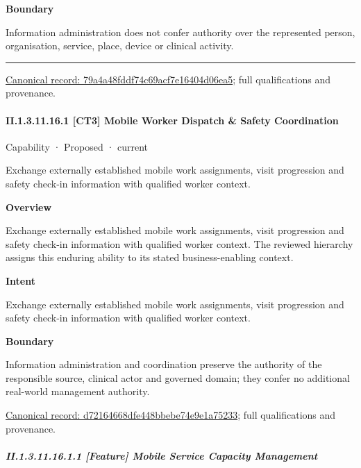 \textbf{Boundary}



Information administration does not confer authority over the represented person, organisation, service, place, device or clinical activity.



\medskip\hrule\medskip

{\footnotesize \href{../../../../continuum/strategy/capability/79a4a48fddf74c69acf7e16404d06ea5.md}{Canonical record: 79a4a48fddf74c69acf7e16404d06ea5}; full qualifications and provenance.}\par
\paragraph*{II.1.3.11.16.1 [CT3] Mobile Worker Dispatch \& Safety Coordination}
\label{navigation:II.1.3.11.16.1}

\label{element:d72164668dfe448bbebe74e9e1a75233}
{\small Capability · Proposed · current}\par

Exchange externally established mobile work assignments, visit progression and safety check-in information with qualified worker context.



\textbf{Overview}



Exchange externally established mobile work assignments, visit progression and safety check-in information with qualified worker context. The reviewed hierarchy assigns this enduring ability to its stated business-enabling context.



\textbf{Intent}



Exchange externally established mobile work assignments, visit progression and safety check-in information with qualified worker context.



\textbf{Boundary}



Information administration and coordination preserve the authority of the responsible source, clinical actor and governed domain; they confer no additional real-world management authority.


{\footnotesize \href{../../../../continuum/strategy/capability/d72164668dfe448bbebe74e9e1a75233.md}{Canonical record: d72164668dfe448bbebe74e9e1a75233}; full qualifications and provenance.}\par
\subparagraph*{II.1.3.11.16.1.1 [Feature] Mobile Service Capacity Management}
\label{navigation:II.1.3.11.16.1.1}


